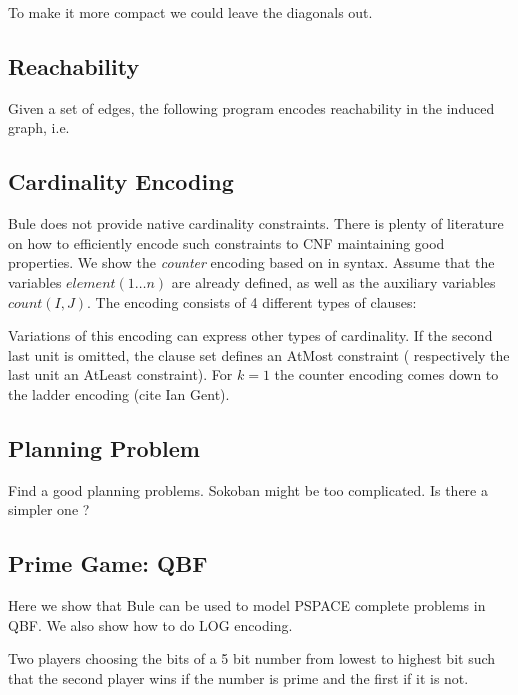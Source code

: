 \documentclass[conference]{IEEEtran}
\begin{document}


To make it more compact we could leave the diagonals out. 

\subsection{Reachability}

Given a set of edges, the following program encodes reachability in the induced graph, i.e. 



\subsection{Cardinality Encoding}

Bule does not provide native cardinality constraints. 
There is plenty of literature on how to efficiently encode such constraints to CNF maintaining good properties. 
We show the \emph{counter} encoding based on \cite{Sinz05} in \bnice syntax.
Assume that the variables $element(1\ldots n)$ are already defined, as well as 
the auxiliary variables $count(I,J)$. 
The encoding consists of 4 different types of clauses: 



Variations of this encoding can express other types of cardinality.
If the second last unit is omitted, the clause set defines an AtMost constraint ( respectively the last unit an AtLeast constraint). 
For $k=1$ the counter encoding comes down to the ladder encoding (cite Ian Gent). 

\subsection{Planning Problem}

Find a good planning problems. 
Sokoban might be too complicated. 
Is there a simpler one ? 

\subsection{Prime Game: QBF}

Here we show that Bule can be used to model PSPACE complete problems in QBF. 
We also show how to do LOG encoding.  

Two players choosing the bits of a 5 bit number from lowest to highest bit such that 
the second player wins if the number is prime and the first if it is not. 
\end{document}
